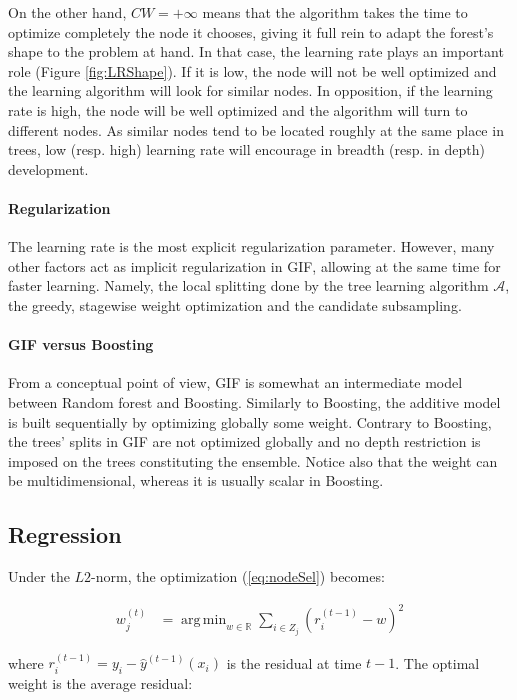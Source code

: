 \documentclass{article}
\DeclareMathOperator*{\argmin}{arg\,min}
\begin{document}
On the other hand, $CW=+\infty$ means that the algorithm takes the 
time to optimize completely the node it chooses, giving it full rein to adapt 
the forest's shape to the problem at hand. In that case, the learning rate 
plays an important role (Figure \ref{fig:LRShape}). If it is low, the node will 
not be well optimized and the learning algorithm will look for similar nodes. 
In opposition, if the learning rate is high, the node will be well optimized 
and the algorithm will turn to different nodes.
As similar nodes tend to be located roughly at the same place in trees, low 
(resp. high) learning rate will encourage in breadth (resp. in depth) 
development.

\paragraph{Regularization}
The learning rate is the most explicit regularization parameter. However, many 
other factors act as implicit regularization in GIF, allowing at the same time 
for faster learning. 
Namely, the local splitting done by the tree learning algorithm $\mathcal{A}$, 
the greedy, stagewise weight optimization and the candidate subsampling.


\paragraph{GIF versus Boosting}
From a conceptual point of view, GIF is somewhat an intermediate model 
between Random forest and Boosting. Similarly to Boosting, the additive model 
is  built sequentially by optimizing globally some weight. Contrary to 
Boosting, the trees' splits in GIF are not optimized globally and no depth 
restriction is imposed on the trees constituting the ensemble. Notice also that 
the weight can be multidimensional, whereas it is usually scalar in Boosting.


\subsection{Regression}
\label{subsec:regression}

Under the $L2$-norm, the optimization (\ref{eq:nodeSel}) becomes:

\begin{align}\label{eq:L2min}
w_j^{(t)} &=  \argmin_{w \in \mathbb{R}} \sum_{i \in Z_j} \left(r_i^{(t-1)} - 
w\right)^2
\end{align}

where $r_i^{(t-1)} = y_i - \hat{y}^{(t-1)}(x_i)$ is the residual at time $t-1$.
The optimal weight is the average residual:
\end{document}
